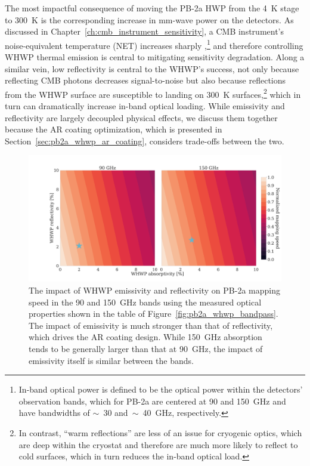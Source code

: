 The most impactful consequence of moving the PB-2a HWP from the 4~K stage to 300~K is the corresponding increase in mm-wave power on the detectors. As discussed in Chapter~\ref{ch:cmb_instrument_sensitivity}, a CMB instrument's noise-equivalent temperature (NET) increases sharply ,\footnote{In-band optical power is defined to be the optical power within the detectors' observation bands, which for PB-2a are centered at 90 and 150~GHz and have bandwidths of $\sim$~30 and~$\sim$~40~GHz, respectively.} and therefore controlling WHWP thermal emission is central to mitigating sensitivity degradation. Along a similar vein, low reflectivity is central to the WHWP's success, not only because reflecting CMB photons decreases signal-to-noise but also because reflections from the WHWP surface are susceptible to landing on 300~K surfaces,\footnote{In contrast, ``warm reflections'' are less of an issue for cryogenic optics, which are deep within the cryostat and therefore are much more likely to reflect to cold surfaces, which in turn reduces the in-band optical load.} which in turn can dramatically increase in-band optical loading. While emissivity and reflectivity are largely decoupled physical effects, we discuss them together because the AR coating optimization, which is presented in Section~\ref{sec:pb2a_whwp_ar_coating}, considers trade-offs between the two.

\begin{figure}[!t]
    \centering
    \includegraphics[width=\linewidth, trim=3cm 1cm 0cm 2.5cm, clip]{PB2aWHWP/Figures/pb2a_whwp_absorption_reflection_mappingSpeed.pdf}
    \caption[Impact of WHWP emissivity and reflectivity on PB-2a mapping speed.]{The impact of WHWP emissivity and reflectivity on PB-2a mapping speed in the 90 and 150~GHz bands using the measured optical properties shown in the table of Figure~\ref{fig:pb2a_whwp_bandpass}. The impact of emissivity is much stronger than that of reflectivity, which drives the AR coating design. While 150~GHz absorption tends to be generally larger than that at 90~GHz, the impact of emissivity itself is similar between the bands.}
    \label{fig:pb2a_whwp_emissivity_reflectivity_mappingSpeed}
\end{figure}

